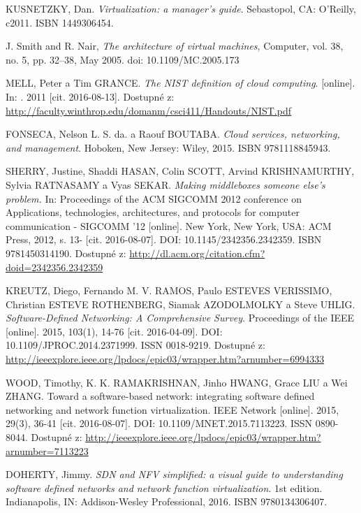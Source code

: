 \begin{thebibliography}{10}
KUSNETZKY, Dan. \emph{Virtualization: a manager's guide}. Sebastopol, CA: O'Reilly, c2011. ISBN 1449306454.

J. Smith and R. Nair, \emph{The architecture of virtual machines}, Computer, vol. 38, no. 5, pp. 32–38, May 2005. doi: 10.1109/MC.2005.173

MELL, Peter a Tim GRANCE. \emph{The NIST definition of cloud computing}. [online]. In: . 2011 [cit. 2016-08-13]. Dostupné z: \url{http://faculty.winthrop.edu/domanm/csci411/Handouts/NIST.pdf}

FONSECA, Nelson L. S. da. a Raouf BOUTABA. \emph{Cloud services, networking, and management}. Hoboken, New Jersey: Wiley, 2015. ISBN 9781118845943.

SHERRY, Justine, Shaddi HASAN, Colin SCOTT, Arvind KRISHNAMURTHY, Sylvia RATNASAMY a Vyas SEKAR. \emph{Making middleboxes someone else's problem.} In: Proceedings of the ACM SIGCOMM 2012 conference on Applications, technologies, architectures, and protocols for computer communication - SIGCOMM '12 [online]. New York, New York, USA: ACM Press, 2012, s. 13- [cit. 2016-08-07]. DOI: 10.1145/2342356.2342359. ISBN 9781450314190. Dostupné z: \url{http://dl.acm.org/citation.cfm?doid=2342356.2342359}

KREUTZ, Diego, Fernando M. V. RAMOS, Paulo ESTEVES VERISSIMO, Christian ESTEVE ROTHENBERG, Siamak AZODOLMOLKY a Steve UHLIG. \emph{Software-Defined Networking: A Comprehensive Survey}. Proceedings of the IEEE [online]. 2015, 103(1), 14-76 [cit. 2016-04-09]. DOI: 10.1109/JPROC.2014.2371999. ISSN 0018-9219. Dostupné z: \url{http://ieeexplore.ieee.org/lpdocs/epic03/wrapper.htm?arnumber=6994333}

WOOD, Timothy, K. K. RAMAKRISHNAN, Jinho HWANG, Grace LIU a Wei ZHANG. Toward a software-based network: integrating software defined networking and network function virtualization. IEEE Network [online]. 2015, 29(3), 36-41 [cit. 2016-08-07]. DOI: 10.1109/MNET.2015.7113223. ISSN 0890-8044. Dostupné z: \url{http://ieeexplore.ieee.org/lpdocs/epic03/wrapper.htm?arnumber=7113223}

 DOHERTY, Jimmy. \emph{SDN and NFV simplified: a visual guide to understanding software defined networks and network function virtualization}. 1st edition. Indianapolis, IN: Addison-Wesley Professional, 2016. ISBN 9780134306407.



\end{thebibliography}
